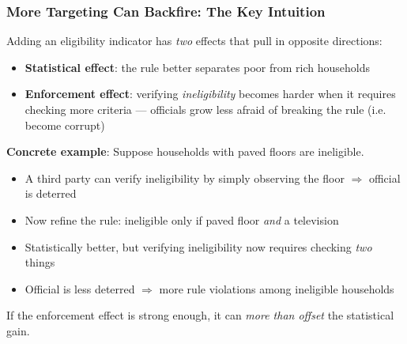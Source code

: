 \documentclass[aspectratio=169]{beamer}
\begin{document}
\begin{frame}
\frametitle{More Targeting Can Backfire: The Key Intuition}

Adding an eligibility indicator has \textit{two} effects that pull in opposite directions:\medskip

\begin{itemize}\setlength\itemsep{6pt}
    \item[\textbf{(+)}] \textbf{Statistical effect}: the rule better separates poor from rich households
    \item[\textbf{(-)}] \textbf{Enforcement effect}: verifying \textit{ineligibility} becomes harder when it requires checking more criteria --- officials grow less afraid of breaking the rule (i.e. become corrupt)
\end{itemize}\medskip

\textbf{Concrete example}: Suppose households with paved floors are ineligible.
\begin{itemize}\setlength\itemsep{3pt}
    \item A third party can verify ineligibility by simply observing the floor $\Rightarrow$ official is deterred
    \item Now refine the rule: ineligible only if paved floor \textit{and} a television
    \item Statistically better, but verifying ineligibility now requires checking \textit{two} things
    \item Official is less deterred $\Rightarrow$ more rule violations among ineligible households
\end{itemize}\medskip

If the enforcement effect is strong enough, it can \textit{more than offset} the statistical gain.

\end{frame}
\end{document}
